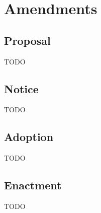 \chapter{Amendments}

\section{Proposal}\label{sec:proposal}
TODO

\section{Notice}\label{sec:notice}
TODO

\section{Adoption}\label{sec:adoption}
TODO

\section{Enactment}\label{sec:enactment}
TODO
